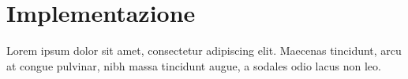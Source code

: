 \chapter{Implementazione}
Lorem ipsum dolor sit amet, consectetur adipiscing elit. Maecenas tincidunt,
arcu at congue pulvinar, nibh massa tincidunt augue, a sodales odio lacus non
leo.

